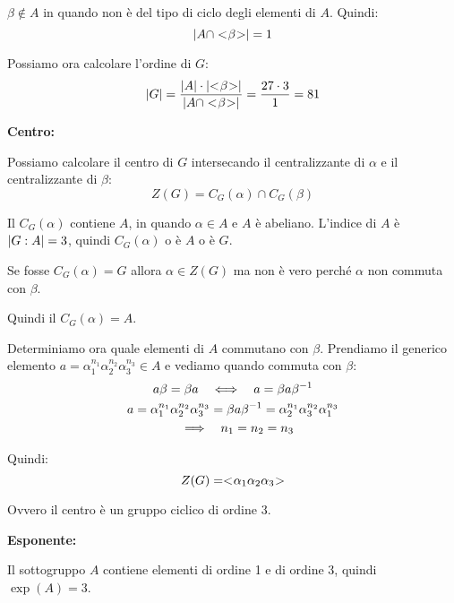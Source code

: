 \begin{soluzione}
    $\beta \not\in A$ in quando non è del tipo di ciclo degli elementi di $A$.
    Quindi:
    \begin{equation*}
        \lvert A \cap < \negmedspace \beta \negmedspace > \rvert = 1
    \end{equation*}

    Possiamo ora calcolare l'ordine di $G$:
    \begin{equation*}
        \lvert G \rvert = \dfrac{\lvert A \rvert \cdot \lvert < \negmedspace \beta \negmedspace > \rvert}{\lvert A \cap < \negmedspace \beta \negmedspace > \rvert} = \dfrac{27 \cdot 3}{1} = 81
    \end{equation*}

    \bigskip
    \textbf{Centro:}

    Possiamo calcolare il centro di $G$ intersecando il centralizzante di $\alpha$ e il centralizzante di $\beta$:
    \begin{equation*}
        Z(G) = C_G(\alpha) \cap C_G(\beta)
    \end{equation*}

    Il $C_G(\alpha)$ contiene $A$, in quando $\alpha \in A$ e $A$ è abeliano.
    L'indice di $A$ è $\lvert G:A \rvert = 3$, quindi $C_G(\alpha)$ o è $A$ o è $G$.

    Se fosse $C_G(\alpha) = G$ allora $\alpha \in Z(G)$ ma non è vero perché $\alpha$ non commuta con $\beta$.

    Quindi il $C_G(\alpha) = A$.

    Determiniamo ora quale elementi di $A$ commutano con $\beta$.
    Prendiamo il generico elemento $a = \alpha_1^{n_1}\alpha_2^{n_2}\alpha_3^{n_3} \in A$ e vediamo quando commuta con
    $\beta$:
    \begin{gather*}
        a \beta = \beta a \quad\Longleftrightarrow\quad a = \beta a \beta^{-1} \\
        a = \alpha_1^{n_1}\alpha_2^{n_2}\alpha_3^{n_3} = \beta a \beta^{-1} = \alpha_2^{n_1}\alpha_3^{n_2}\alpha_1^{n_3} \\
        \quad\Longrightarrow\quad n_1 = n_2 = n_3
    \end{gather*}

    Quindi:
    \begin{equation*}
        Z(G) = < \negmedspace \alpha_1\alpha_2\alpha_3 \negmedspace >
    \end{equation*}

    Ovvero il centro è un gruppo ciclico di ordine 3.

    \bigskip
    \textbf{Esponente:}

    Il sottogruppo $A$ contiene elementi di ordine 1 e di ordine 3, quindi $\exp(A) = 3$.


\end{soluzione}
